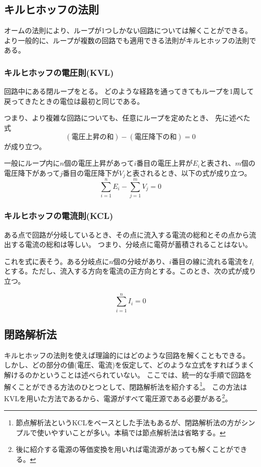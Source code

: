 \documentclass{ltjsreport}
\begin{document}
\subsection{キルヒホッフの法則}
オームの法則により、ループが1つしかない回路については解くことができる。
より一般的に、ループが複数の回路でも適用できる法則がキルヒホッフの法則である。



\subsubsection{キルヒホッフの電圧則(KVL)}
回路中にある閉ループをとる。
どのような経路を通ってきてもループを1周して戻ってきたときの電位は最初と同じである。

つまり、より複雑な回路についても、任意にループを定めたとき、
先に述べた式
\[
  (電圧上昇の和)-(電圧降下の和) =0
\]
が成り立つ。

一般にループ内に$n$個の電圧上昇があって$i$番目の電圧上昇が$E_i$と表され、$m$個の電圧降下があって$j$番目の電圧降下が$V_j$と表されるとき、以下の式が成り立つ。
\begin{equation}
  \sum_{i=1}^{n} E_i - \sum_{j=1}^{m} V_j = 0
\end{equation}



\subsubsection{キルヒホッフの電流則(KCL)}
ある点で回路が分岐しているとき、その点に流入する電流の総和とその点から流出する電流の総和は等しい。
つまり、分岐点に電荷が蓄積されることはない。

これを式に表そう。ある分岐点に$n$個の分岐があり、$i$番目の線に流れる電流を$I_i$とする。ただし、流入する方向を電流の正方向とする。このとき、次の式が成り立つ。

\begin{equation}
  \sum_{i=1}^{n} I_i = 0
\end{equation}





\subsection{閉路解析法}
キルヒホッフの法則を使えば理論的にはどのような回路を解くこともできる。
しかし、どの部分の値(電圧、電流)を仮定して、どのような立式をすればうまく解けるのかということは述べられていない。
ここでは、統一的な手順で回路を解くことができる方法のひとつとして、閉路解析法を紹介する\footnote{節点解析法というKCLをベースとした手法もあるが、閉路解析法の方がシンプルで使いやすいことが多い。本稿では節点解析法は省略する。}。
この方法はKVLを用いた方法であるから、電源がすべて電圧源である必要がある\footnote{後に紹介する電源の等価変換を用いれば電流源があっても解くことができる。}。
\end{document}
